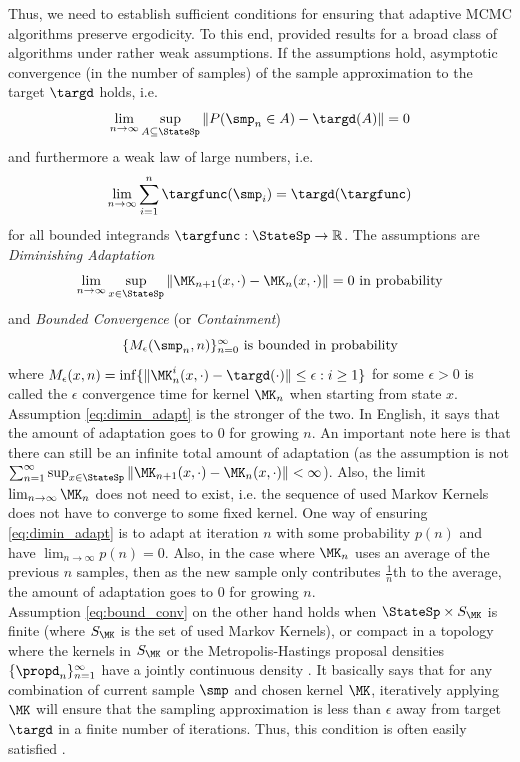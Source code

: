 Thus, we need to establish sufficient conditions for ensuring that adaptive MCMC algorithms preserve ergodicity. To this end, \cite{Roberts2007} provided results for a broad class of algorithms under rather weak assumptions. If the assumptions hold, asymptotic convergence (in the number of samples) of the sample approximation to the target $\targd$ holds, i.e.
\begin{equation}
\lim_{n \rightarrow \infty} \sup_{A\subseteq \StateSp} \|P(\smp_n \in A) - \targd(A)\| = 0
\end{equation}
 and furthermore a weak law of large numbers, i.e.
 \begin{equation}
\lim_{n \rightarrow \infty} \sum_{i=1}^n \targfunc(\smp_i) = \targd(\targfunc)
\end{equation}
for all bounded integrands $\targfunc: \StateSp \rightarrow \mathbb{R}$. The assumptions are  \emph{Diminishing Adaptation}
\begin{equation}
\label{eq:dimin_adapt}
\lim_{n \rightarrow \infty} \sup_{x \in \StateSp} \|\MK_{n+1}(x, \cdot) - \MK_{n}(x, \cdot)\| = 0 \textrm{ in probability}
\end{equation} 
and \emph{Bounded Convergence} (or \emph{Containment})
\begin{equation}
\label{eq:bound_conv}
\{M_\epsilon(\smp_n, n)\}_{n=0}^\infty \textrm{ is bounded in probability}
\end{equation} 
where $M_\epsilon(x, n) = \inf\{\|\MK_n^i(x, \cdot) - \targd(\cdot) \| \leq \epsilon : i \geq 1 \}$ for some $\epsilon > 0$ is called the $\epsilon$ convergence time for kernel $\MK_n$ when starting from state $x$. Assumption \eqref{eq:dimin_adapt} is the stronger of the two. In English, it says that the amount of adaptation goes to $0$ for growing $n$. An important note here is that there can still be an infinite total amount of adaptation (as the assumption is not  $\sum_{n=1}^\infty \sup_{x \in \StateSp} \|\MK_{n+1}(x, \cdot) - \MK_{n}(x, \cdot)\|< \infty$). Also, the limit $ \lim_{n \rightarrow \infty} \MK_n$ does not need to exist, i.e. the sequence of used Markov Kernels does not have to converge to some fixed kernel. One way of ensuring \eqref{eq:dimin_adapt} is to adapt at iteration $n$ with some probability $p(n)$ and have $\lim_{n \rightarrow \infty} p(n) = 0$. Also, in the case where $\MK_n$ uses an average of the previous $n$ samples, then as the new sample only contributes $\frac{1}{n}$th to the average, the amount of adaptation goes to $0$ for growing $n$.\\
Assumption \eqref{eq:bound_conv} on the other hand holds when $\StateSp \times S_\MK$ is finite (where $S_\MK$ is the set of used Markov Kernels), or compact in a topology where the kernels in $S_\MK$ or the Metropolis-Hastings proposal densities $\{\propd_n\}_{n=1}^\infty$ have a jointly continuous density \citep{Rosenthal2011,Roberts2007}. It basically says that for any combination of current sample $\smp$ and chosen kernel $\MK$, iteratively applying $\MK$ will ensure that the sampling approximation is less than $\epsilon$ away from target $\targd$ in a finite number of iterations. Thus, this condition is often easily satisfied \citep[though counterexamples can be constructed, see ][]{Rosenthal2011}.\\
